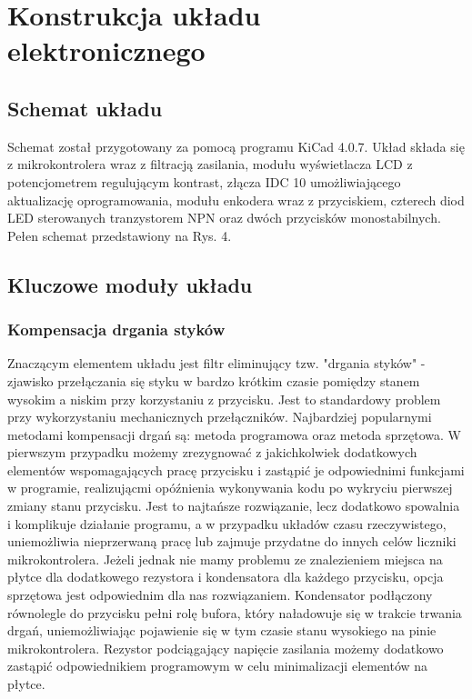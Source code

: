 \documentclass{article}
\begin{document}
\newpage
\section{Konstrukcja układu elektronicznego}
\subsection{Schemat układu}
Schemat został przygotowany za pomocą programu KiCad 4.0.7. Układ składa się z mikrokontrolera wraz z filtracją zasilania, modułu wyświetlacza LCD z potencjometrem regulującym kontrast, złącza IDC 10 umożliwiającego aktualizację oprogramowania, modułu enkodera wraz z przyciskiem, czterech diod LED sterowanych tranzystorem NPN oraz dwóch przycisków monostabilnych. Pełen schemat przedstawiony na Rys. 4.

	
\subsection{Kluczowe moduły układu}
\subsubsection{Kompensacja drgania styków}
Znaczącym elementem układu jest filtr eliminujący tzw. "drgania styków" - zjawisko przełączania się styku w bardzo krótkim czasie pomiędzy stanem wysokim a niskim przy korzystaniu z przycisku. Jest to standardowy problem przy wykorzystaniu mechanicznych przełączników. Najbardziej popularnymi metodami kompensacji drgań są: metoda programowa oraz metoda sprzętowa. W pierwszym przypadku możemy zrezygnować z jakichkolwiek dodatkowych elementów wspomagających pracę przycisku i zastąpić je odpowiednimi funkcjami w programie, realizującmi opóźnienia wykonywania kodu po wykryciu pierwszej zmiany stanu przycisku. Jest to najtańsze rozwiązanie, lecz dodatkowo spowalnia i komplikuje działanie programu, a w przypadku układów czasu rzeczywistego, uniemożliwia nieprzerwaną pracę lub zajmuje przydatne do innych celów liczniki mikrokontrolera. Jeżeli jednak nie mamy problemu ze znalezieniem miejsca na płytce dla dodatkowego rezystora i kondensatora dla każdego przycisku, opcja sprzętowa jest odpowiednim dla nas rozwiązaniem. Kondensator podłączony równolegle do przycisku pełni rolę bufora, który naładowuje się w trakcie trwania drgań, uniemożliwiając pojawienie się w tym czasie stanu wysokiego na pinie mikrokontrolera. Rezystor podciągający napięcie zasilania możemy dodatkowo zastąpić odpowiednikiem programowym w celu minimalizacji elementów na płytce. 
\end{document}
